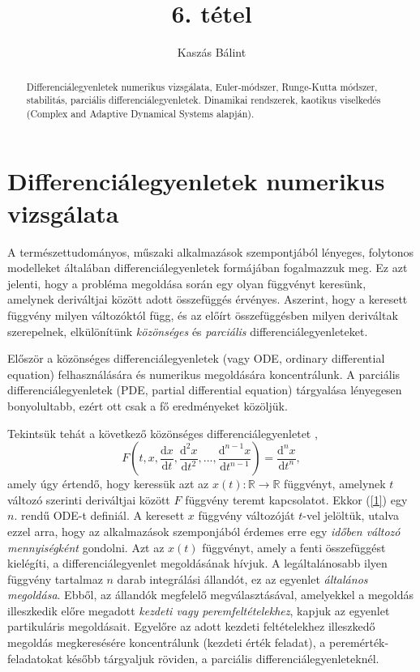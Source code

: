 \documentclass[12pt]{article}
\theoremstyle{plain}
\newcommand{\rtor}{
\mathbb{R} \to \mathbb{R}
}
\begin{document}
\title{6. tétel}
\author{Kaszás Bálint}

\maketitle


\begin{abstract}
    Differenciálegyenletek numerikus vizsgálata, Euler-módszer, Runge-Kutta módszer, stabilitás, parciális differenciálegyenletek. Dinamikai rendszerek, kaotikus viselkedés (Complex and Adaptive Dynamical Systems alapján).
\end{abstract}

\vfill

\tableofcontents

\newpage

\section{Differenciálegyenletek numerikus vizsgálata}
A természettudományos, műszaki alkalmazások szempontjából lényeges, folytonos modelleket általában differenciálegyenletek formájában fogalmazzuk meg. Ez azt jelenti, hogy a probléma megoldása során egy olyan függvényt keresünk, amelynek deriváltjai között adott összefüggés érvényes. Aszerint, hogy a keresett függvény milyen változóktól függ, és az előírt összefüggésben milyen deriváltak szerepelnek, elkülönítünk {\em közönséges} és {\em parciális} differenciálegyenleteket. 

Először a közönséges differenciálegyenletek (vagy ODE, ordinary differential equation) felhasználására és numerikus megoldására koncentrálunk. A parciális differenciálegyenletek (PDE, partial differential equation) tárgyalása lényegesen bonyolultabb, ezért ott csak a fő eredményeket közöljük.

Tekintsük tehát a következő közönséges differenciálegyenletet \cite{ode},
\begin{equation}
    \label{1}
    F\left(t, x, \frac{\text{d}x}{\text{d}t}, \frac{\text{d}^2x}{\text{d}t^2}, ..., \frac{\text{d}^{n-1}x}{\text{d}t^{n-1}}\right) = \frac{\text{d}^nx}{\text{d}t^n},
\end{equation}
amely úgy értendő, hogy keressük azt az $x(t) : \rtor$ függvényt, amelynek $t$ változó szerinti deriváltjai között $F$ függvény teremt kapcsolatot. Ekkor (\ref{1}) egy $n$. rendű ODE-t definiál. A keresett $x$ függvény változóját $t$-vel jelöltük, utalva ezzel arra, hogy az alkalmazások szemponjából érdemes erre egy {\em időben változó mennyiségként} gondolni.  Azt az $x(t)$ függvényt, amely a fenti összefüggést kielégíti, a differenciálegyenlet megoldásának hívjuk. A legáltalánosabb ilyen függvény tartalmaz $n$ darab integrálási állandót, ez az egyenlet {\em általános megoldása}. Ebből, az állandók megfelelő megválasztásával, amelyekkel a megoldás illeszkedik előre megadott {\em kezdeti vagy peremfeltételekhez}, kapjuk az egyenlet partikuláris megoldásait. Egyelőre az adott kezdeti feltételekhez illeszkedő megoldás megkeresésére koncentrálunk (kezdeti érték feladat), a peremérték-feladatokat később tárgyaljuk röviden, a parciális differenciálegyenleteknél. 
\end{document}
